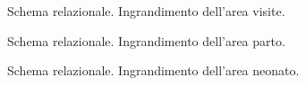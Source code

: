\begin{figure}
    \centering
    
    \caption{Schema relazionale. Ingrandimento dell'area visite.}
\label{visitsreldiagram}
\end{figure}

\begin{figure}
    \centering
    
    \caption{Schema relazionale. Ingrandimento dell'area parto.}
\label{deliveryreldiagram}
\end{figure}

\begin{figure}
    \centering
    
    \caption{Schema relazionale. Ingrandimento dell'area neonato.}
\label{newbornreldiagram}
\end{figure}